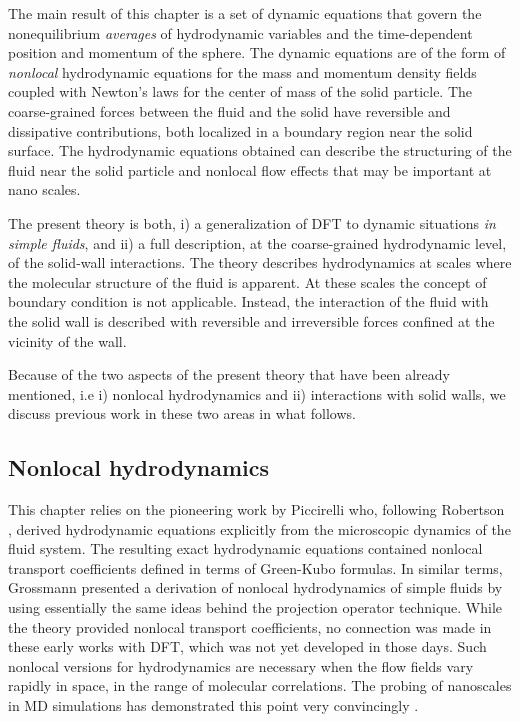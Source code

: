 \documentclass[b5paper,openright,10pt]{book}
\begin{document}
The main result of this chapter is a set of dynamic equations that
govern the nonequilibrium \textit{averages} of hydrodynamic variables
and  the time-dependent  position  and momentum  of  the sphere.   The
dynamic equations  are of the form  of \textit{nonlocal} hydrodynamic
equations  for  the mass  and  momentum  density fields  coupled  with
Newton's  laws for  the center  of mass  of the  solid particle.   The
coarse-grained forces between the fluid  and the solid have reversible
and  dissipative contributions,  both localized  in a  boundary region
near  the  solid surface.   The  hydrodynamic  equations obtained  can
describe  the structuring  of the  fluid near  the solid  particle and
nonlocal flow effects that may be important at nano scales.

The  present  theory  is   both,  i)  a
generalization  of DFT  to dynamic  situations
\textit{in simple  fluids},
and ii) a full description,  at the coarse-grained hydrodynamic level,
of the solid-wall interactions.  The theory describes hydrodynamics at
scales  where the  molecular structure  of the  fluid is  apparent. At
these   scales   the   concept    of   boundary   condition   is   not
applicable. Instead, the interaction of  the fluid with the solid wall
is described with  reversible and irreversible forces  confined at the
vicinity of the wall.

Because  of the  two  aspects of  the present  theory  that have  been
already mentioned, i.e i) nonlocal hydrodynamics and ii) interactions
with solid walls, we discuss previous  work in these two areas in what
follows.

\subsection{Nonlocal hydrodynamics}
This   chapter    relies   on   the   pioneering    work   by   Piccirelli
\cite{Piccirelli1968}  who, following  Robertson \cite{Robertson1966},
derived  hydrodynamic   equations  explicitly  from   the  microscopic
dynamics  of  the fluid  system.   The  resulting   exact  hydrodynamic  equations
contained  nonlocal  transport  coefficients   defined  in  terms  of
Green-Kubo formulas.  In  similar terms, Grossmann \cite{Grossmann1970}
presented a derivation of nonlocal  hydrodynamics of simple fluids by
using  essentially  the  same  ideas behind  the  projection  operator
technique.    While   the    theory   provided   nonlocal   transport
coefficients, no connection was made in these early works with DFT,  which was not  yet developed in those  days.  Such
nonlocal  versions  for hydrodynamics  are  necessary  when the  flow
fields vary rapidly in space,  in the range of molecular correlations.
The  probing of  nanoscales in  MD simulations  has demonstrated  this
point                         very                        convincingly
\cite{Zhang2004,Hansen2007,Todd2008a,Hansen2011}.
\end{document}

